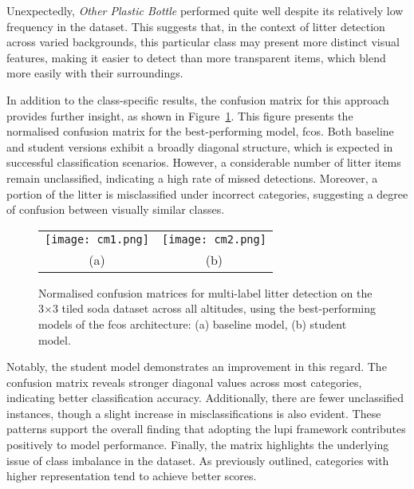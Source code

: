Unexpectedly, \textit{Other Plastic Bottle} performed quite well despite its relatively low frequency in the dataset. This suggests that, in the context of litter detection across varied backgrounds, this particular class may present more distinct visual features, making it easier to detect than more transparent items, which blend more easily with their surroundings.

In addition to the class-specific results, the confusion matrix for this approach provides further insight, as shown in Figure~\ref{fig:cm_soda}. This figure presents the normalised confusion matrix for the best-performing model, \gls{fcos}. Both baseline and student versions exhibit a broadly diagonal structure, which is expected in successful classification scenarios. However, a considerable number of litter items remain unclassified, indicating a high rate of missed detections. Moreover, a portion of the litter is misclassified under incorrect categories, suggesting a degree of confusion between visually similar classes.

\begin{figure}[!ht]
  \centering
  \begin{tabular}{cc}
    \texttt{[image: cm1.png]} &
    \texttt{[image: cm2.png]} \\
    \small (a) & \small (b) \\
  \end{tabular}
  \caption{Normalised confusion matrices for multi-label litter detection on the 3$\times$3 tiled \gls{soda} dataset across all altitudes, using the best-performing models of the \gls{fcos} architecture: (a) baseline model, (b) student model.}
  \label{fig:cm_soda}
\end{figure}

Notably, the student model demonstrates an improvement in this regard. The confusion matrix reveals stronger diagonal values across most categories, indicating better classification accuracy. Additionally, there are fewer unclassified instances, though a slight increase in misclassifications is also evident. These patterns support the overall finding that adopting the \gls{lupi} framework contributes positively to model performance.
Finally, the matrix highlights the underlying issue of class imbalance in the dataset. As previously outlined, categories with higher representation tend to achieve better scores.


